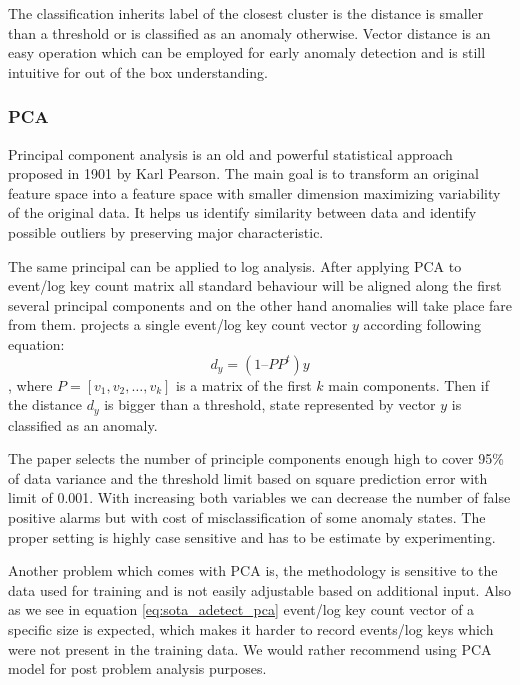The classification inherits label of the closest cluster is the distance is smaller than a threshold or is classified as an anomaly otherwise. Vector distance is an easy operation which can be employed for early anomaly detection and is still intuitive for out of the box understanding.

\subsubsection{PCA}

Principal component analysis is an old and powerful statistical approach proposed in 1901 by Karl Pearson. The main goal is to transform an original feature space into a feature space with smaller dimension maximizing variability of the original data. It helps us identify similarity between data and identify possible outliers by preserving major characteristic.

The same principal can be applied to log analysis. After applying PCA to event/log key count matrix all standard behaviour will be aligned along the first several principal components and on the other hand anomalies will take place fare from them. \cite{xu2009detecting} projects a single event/log key count vector $y$ according following equation:
\begin{equation}
\label{eq:sota_adetect_pca}
d_{y} = (1 – PP^{t})y
\end{equation}
, where $P = [ v_{1}, v_{2}, … , v_{k}]$ is a matrix of the first $k$ main components. Then if the distance $ d_{y}$ is bigger than a threshold, state represented by vector $y$ is classified as an anomaly. 

The paper selects the number of principle components enough high to cover 95\% of data variance and the threshold limit based on square prediction error with limit of 0.001. With increasing both variables we can decrease the number of false positive alarms but with cost of misclassification of some anomaly states. The proper setting is highly case sensitive and has to be estimate by experimenting.

Another problem which comes with PCA is, the methodology is sensitive to the data used for training and is not easily adjustable based on additional input. Also as we see in equation \ref{eq:sota_adetect_pca} event/log key count vector of a specific size is expected, which makes it harder to record events/log keys which were not present in the training data. We would rather recommend using PCA model for post problem analysis purposes.


